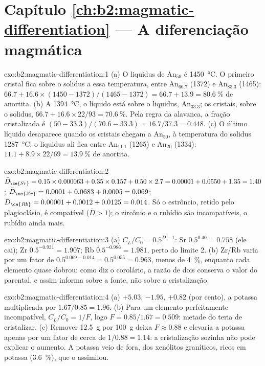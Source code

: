 \section*{Capítulo \ref{ch:b2:magmatic-differentiation} --- A diferenciação magmática}

\begin{solution}{exo:b2:magmatic-differentiation:1}
(a) O liquidus de An$_{50}$ é \qty{1450}{\celsius}. O primeiro cristal fica sobre o
solidus a essa temperatura, entre An$_{66.7}$ (1372) e An$_{83.3}$ (1465):
$66.7 + 16.6\times(1450 - 1372)/(1465 - 1372) = 66.7 + 13.9 = \qty{80.6}{\percent}$
de anortita. (b) A \qty{1394}{\celsius}, o líquido está sobre o liquidus,
An$_{33.3}$; os cristais, sobre o solidus, $66.7 + 16.6\times22/93 =
\qty{70.6}{\percent}$. Pela regra da alavanca, a fração cristalizada é $(50 -
33.3)/(70.6 - 33.3) = 16.7/37.3 = 0.448$. (c) O último líquido desaparece quando os
cristais chegam a An$_{50}$, à temperatura do solidus \qty{1287}{\celsius}; o
liquidus ali fica entre An$_{11.1}$ (1265) e An$_{20}$ (1334): $11.1 +
8.9\times22/69 = \qty{13.9}{\percent}$ de anortita.
\end{solution}

\begin{solution}{exo:b2:magmatic-differentiation:2}
$\bar D_{\ce{Sr}} = 0.15\times0.000063 + 0.35\times0.157 + 0.50\times2.7 = 0.00001 +
0.0550 + 1.35 = 1.40$; $\bar D_{\ce{Zr}} = 0.0001 + 0.0683 + 0.0005 = 0.069$;
$\bar D_{\ce{Rb}} = 0.00001 + 0.0012 + 0.0125 = 0.014$. Só o estrôncio, retido pelo
plagioclásio, é compatível ($\bar D > 1$); o zircônio e o rubídio são incompatíveis,
o rubídio ainda mais.
\end{solution}

\begin{solution}{exo:b2:magmatic-differentiation:3}
(a) $C_L/C_0 = 0.5^{D-1}$: Sr $0.5^{0.40} = 0.758$ (ele cai); Zr $0.5^{-0.931} =
1.907$; Rb $0.5^{-0.986} = 1.981$, perto do limite 2. (b) Zr/Rb varia por um fator de
$0.5^{0.069 - 0.014} = 0.5^{0.055} = 0.963$, menos de \qty{4}{\percent}, enquanto cada
elemento quase dobrou: como diz o corolário, a razão de dois  conserva o valor do  parental, e assim informa sobre a fonte, não
sobre a cristalização.
\end{solution}

\begin{solution}{exo:b2:magmatic-differentiation:4}
(a)  $+5.03$,  $-1.95$,  $+0.82$ (por cento), a potassa
multiplicada por $1.67/0.85 = 1.96$. (b) Para um elemento perfeitamente incompatível,
$C_L/C_0 = 1/F$, logo $F = 0.85/1.67 = 0.509$: metade do  teria de
cristalizar. (c) Remover \qty{12.5}{g} por \qty{100}{g} deixa $F \approx 0.88$ e
elevaria a potassa apenas por um fator de cerca de $1/0.88 = 1.14$: a cristalização sozinha não pode
explicar o aumento. A potassa veio de fora, dos xenólitos graníticos, ricos em
potassa (\qty{3.6}{\percent}), que o  assimilou.
\end{solution}

